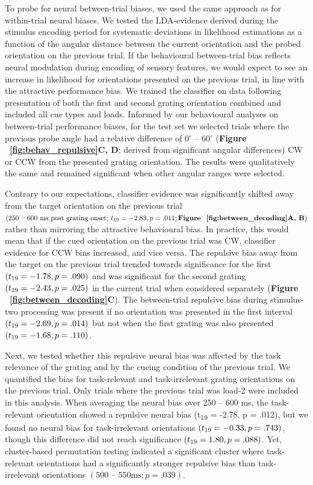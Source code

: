 \documentclass{article}
\begin{document}
\begin{large}
To probe for neural between-trial biases, we used the same approach as for within-trial neural biases. We tested the LDA-evidence derived during the stimulus encoding period for systematic deviations in likelihood estimations as a function of the angular distance between the current orientation and the probed orientation on the previous trial. If the behavioural between-trial bias reflects neural modulation during encoding of sensory features, we would expect to see an increase in likelihood for orientations presented on the previous trial, in line with the attractive performance bias. We trained the classifier on data following presentation of both the first and second grating orientation combined and included all cue types and loads. Informed by our behavioural analyses on between-trial performance biases, for the test set we selected trials where the previous probe angle had a relative difference of 0$^{\circ}$ – 60$^{\circ}$ (\textbf{Figure ~\ref{fig:behav_repulsive}C, D}; derived from significant angular differences) CW or CCW from the presented grating orientation. The results were qualitatively the same and remained significant when other angular ranges were selected. 

Contrary to our expectations, classifier evidence was significantly shifted away from the target orientation on the previous trial $(\text{250 – 600 ms post grating onset; } t\textsubscript{19} = -2.83, p = .011; \text{\textbf{Figure ~\ref{fig:between_decoding}A, B}})$ rather than mirroring the attractive behavioural bias. In practice, this would mean that if the cued orientation on the previous trial was CW, classifier evidence for CCW bins increased, and vice versa. The repulsive bias away from the target on the previous trial trended towards significance for the first $(t\textsubscript{19} = -1.78, p = .090)$ and was significant for the second grating $(t\textsubscript{19} = -2.43, p = .025)$ in the current trial when considered separately (\textbf{Figure ~\ref{fig:between_decoding}C}). The between-trial repulsive bias during stimulus-two processing was present if no orientation was presented in the first interval $(t\textsubscript{19} = -2.69, p = .014)$ but not when the first grating was also presented $(t\textsubscript{19} = -1.68, p = .110)$. 

Next, we tested whether this repulsive neural bias was affected by the task relevance of the grating and by the cueing condition of the previous trial. We quantified the bias for task-relevant and task-irrelevant grating orientations on the previous trial. Only trials where the previous trial was load-2 were included in this analysis. When averaging the neural bias over 250 – 600 ms, the task-relevant orientation showed a repulsive neural bias (t\textsubscript{19} = -2.78, p = .012), but we found no neural bias for task-irrelevant orientations $(t\textsubscript{19} = -0.33, p = .743)$, though this difference did not reach significance $(t\textsubscript{19} = 1.80, p = .088)$. Yet, cluster-based permutation testing indicated a significant cluster where task-relevant orientations had a significantly stronger repulsive bias than task-irrelevant orientations $(500 \text{ – } 550 \text{ms}; p = .039)$. \\


\end{large}
\end{document}
